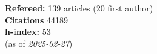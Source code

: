 \textbf{Refereed:} 139 articles (20 first author)\\\textbf{Citations} 44189\\\textbf{h-index:} 53\\(as of \textit{2025-02-27})